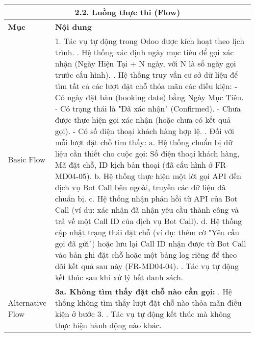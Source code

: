 \begin{longtable}{|m{4cm}|p{11cm}|}
\hline
\multicolumn{2}{|c|}{\textbf{2.2. Luồng thực thi (Flow)}} \\
\hline
\textbf{Mục} & \textbf{Nội dung} \\
\hline
Basic Flow & 1. Tác vụ tự động trong Odoo được kích hoạt theo lịch trình. \newline 2. Hệ thống xác định ngày mục tiêu để gọi xác nhận (Ngày Hiện Tại + N ngày, với N là số ngày gọi trước cấu hình). \newline 3. Hệ thống truy vấn cơ sở dữ liệu để tìm tất cả các lượt đặt chỗ thỏa mãn các điều kiện: \newline    - Có ngày đặt bàn (booking date) bằng Ngày Mục Tiêu. \newline    - Có trạng thái là "Đã xác nhận" (Confirmed). \newline    - Chưa được thực hiện gọi xác nhận (hoặc chưa có kết quả gọi). \newline    - Có số điện thoại khách hàng hợp lệ. \newline 4. Đối với mỗi lượt đặt chỗ tìm thấy: \newline    a. Hệ thống chuẩn bị dữ liệu cần thiết cho cuộc gọi: Số điện thoại khách hàng, Mã đặt chỗ, ID kịch bản thoại (đã cấu hình ở FR-MD04-05). \newline    b. Hệ thống thực hiện một lời gọi API đến dịch vụ Bot Call bên ngoài, truyền các dữ liệu đã chuẩn bị. \newline    c. Hệ thống nhận phản hồi từ API của Bot Call (ví dụ: xác nhận đã nhận yêu cầu thành công và trả về một Call ID của dịch vụ Bot Call). \newline    d. Hệ thống cập nhật trạng thái đặt chỗ (ví dụ: thêm cờ "Yêu cầu gọi đã gửi") hoặc lưu lại Call ID nhận được từ Bot Call vào bản ghi đặt chỗ hoặc một bảng log riêng để theo dõi kết quả sau này (FR-MD04-04). \newline 5. Tác vụ tự động kết thúc sau khi xử lý hết danh sách. \\
\hline
Alternative Flow & \textbf{3a. Không tìm thấy đặt chỗ nào cần gọi:} \newline    1. Hệ thống không tìm thấy lượt đặt chỗ nào thỏa mãn điều kiện ở bước 3. \newline    2. Tác vụ tự động kết thúc mà không thực hiện hành động nào khác. \\
\hline

\end{longtable}
